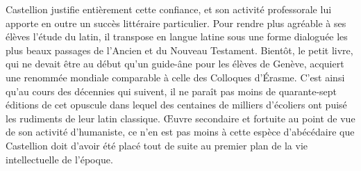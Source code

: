 \documentclass[french,twoside]{book} %
\newcommand{\astermono}{\medskip\centerline{\color{rubric}\large\selectfont{\syms ✻}}\medskip\par}%
\begin{document}
Castellion justifie entièrement cette confiance, et son activité professorale lui apporte en outre un succès littéraire particulier. Pour rendre plus agréable à ses élèves l’étude du latin, il transpose en langue latine sous une forme dialoguée les plus beaux passages de l’Ancien et du Nouveau Testament. Bientôt, le petit livre, qui ne devait être au début qu’un guide-âne pour les élèves de Genève, acquiert une renommée mondiale comparable à celle des Colloques d’Érasme. C’est ainsi qu’au cours des décennies qui suivent, il ne paraît pas moins de quarante-sept éditions de cet opuscule dans lequel des centaines de milliers d’écoliers ont puisé les rudiments de leur latin classique. Œuvre secondaire et fortuite au point de vue de son activité d’humaniste, ce n’en est pas moins à cette espèce d’abécédaire que Castellion doit d’avoir été placé tout de suite au premier plan de la vie intellectuelle de l’époque.\par

\astermono
\end{document}
